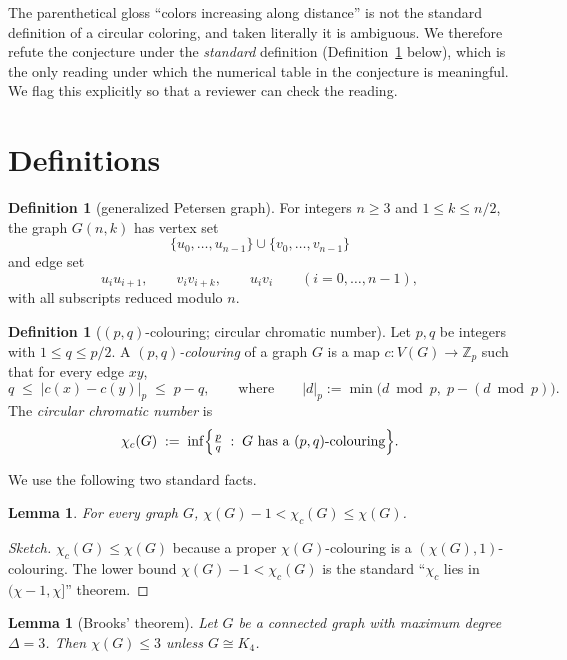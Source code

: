 \documentclass[11pt]{article}
\newtheorem{lemma}[theorem]{Lemma}
\theoremstyle{definition}
\newtheorem{definition}[theorem]{Definition}
\newcommand{\chic}{\chi_c}
\newcommand{\Gn}{G(n,k)}
\begin{document}
The parenthetical gloss ``colors increasing along distance'' is not the
standard definition of a circular coloring, and taken literally it is
ambiguous. We therefore refute the conjecture under the \emph{standard}
definition (Definition~\ref{def:pq} below), which is the only reading under
which the numerical table in the conjecture is meaningful. We flag this
explicitly so that a reviewer can check the reading.

\section{Definitions}

\begin{definition}[generalized Petersen graph]\label{def:gp}
For integers $n \ge 3$ and $1 \le k \le n/2$, the graph $\Gn$ has vertex set
\[
\{u_0, \dots, u_{n-1}\} \cup \{v_0, \dots, v_{n-1}\}
\]
and edge set
\[
u_i u_{i+1}, \qquad v_i v_{i+k}, \qquad u_i v_i
\qquad (i = 0, \dots, n-1),
\]
with all subscripts reduced modulo $n$.
\end{definition}

\begin{definition}[$(p,q)$-colouring; circular chromatic number]\label{def:pq}
Let $p, q$ be integers with $1 \le q \le p/2$. A \emph{$(p,q)$-colouring} of a
graph $G$ is a map $c : V(G) \to \mathbb{Z}_p$ such that for every edge $xy$,
\[
q \;\le\; |c(x) - c(y)|_p \;\le\; p - q,
\qquad\text{where}\qquad
|d|_p := \min\bigl(d \bmod p,\; p - (d \bmod p)\bigr).
\]
The \emph{circular chromatic number} is
\[
\chic(G) \;:=\; \inf\Bigl\{ \tfrac{p}{q} \;:\; G \text{ has a } (p,q)\text{-colouring} \Bigr\}.
\]
\end{definition}

We use the following two standard facts.

\begin{lemma}\label{lem:bound}
For every graph $G$, $\chi(G) - 1 < \chic(G) \le \chi(G)$.
\end{lemma}

\begin{proof}[Sketch]
$\chic(G) \le \chi(G)$ because a proper $\chi(G)$-colouring is a
$(\chi(G), 1)$-colouring. The lower bound $\chi(G) - 1 < \chic(G)$ is the
standard ``$\chic$ lies in $(\chi - 1, \chi]$'' theorem.
\end{proof}

\begin{lemma}[Brooks' theorem]\label{lem:brooks}
Let $G$ be a connected graph with maximum degree $\Delta = 3$. Then
$\chi(G) \le 3$ unless $G \cong K_4$.
\end{lemma}
\end{document}
